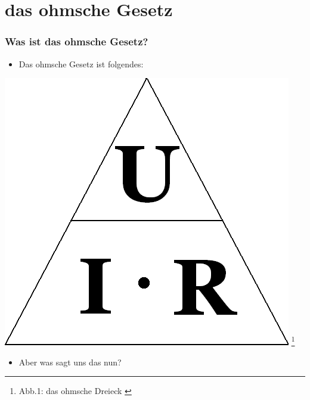 

\subtitle{Technik Klasse E 03 \\
          Ohmsches Gesetz, Leistung \& Arbeit \\[2em]}
\date{Stand 30.10.2014}



\section{das ohmsche Gesetz}

\begin{frame}
    \frametitle{Was ist das ohmsche Gesetz?}
    \begin{itemize}
    	\item Das ohmsche Gesetz ist folgendes:
    \end{itemize}
    \begin{center}
 		\includegraphics[scale=0.3]{e03/Ohm_law_triangle.png}
 		\footnote{Abb.1: das ohmsche Dreieck \cite{wmen}}
 	\end{center}
 	\begin{itemize}
 		\item	Aber was sagt uns das nun?
 	\end{itemize}
\end{frame}

